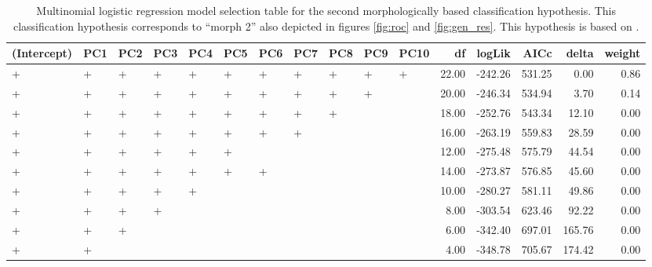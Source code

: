\documentclass[12pt,letterpaper]{article}\usepackage{graphicx, color}
\begin{document}
\begin{table}
  \centering
{\small
\begin{tabular}{lllllllllllrrrrr}
  \hline
(Intercept) & PC1 & PC2 & PC3 & PC4 & PC5 & PC6 & PC7 & PC8 & PC9 & PC10 & df & logLik & AICc & delta & weight \\ 
  \hline
+ & + & + & + & + & + & + & + & + & + & + & 22.00 & -242.26 & 531.25 & 0.00 & 0.86 \\ 
  + & + & + & + & + & + & + & + & + & + &  & 20.00 & -246.34 & 534.94 & 3.70 & 0.14 \\ 
  + & + & + & + & + & + & + & + & + &  &  & 18.00 & -252.76 & 543.34 & 12.10 & 0.00 \\ 
  + & + & + & + & + & + & + & + &  &  &  & 16.00 & -263.19 & 559.83 & 28.59 & 0.00 \\ 
  + & + & + & + & + & + &  &  &  &  &  & 12.00 & -275.48 & 575.79 & 44.54 & 0.00 \\ 
  + & + & + & + & + & + & + &  &  &  &  & 14.00 & -273.87 & 576.85 & 45.60 & 0.00 \\ 
  + & + & + & + & + &  &  &  &  &  &  & 10.00 & -280.27 & 581.11 & 49.86 & 0.00 \\ 
  + & + & + & + &  &  &  &  &  &  &  & 8.00 & -303.54 & 623.46 & 92.22 & 0.00 \\ 
  + & + & + &  &  &  &  &  &  &  &  & 6.00 & -342.40 & 697.01 & 165.76 & 0.00 \\ 
  + & + &  &  &  &  &  &  &  &  &  & 4.00 & -348.78 & 705.67 & 174.42 & 0.00 \\ 
   \hline
\end{tabular}
}


\caption{Multinomial logistic regression model selection table for the second morphologically based classification hypothesis. This classification hypothesis corresponds to ``morph 2'' also depicted in figures \ref{fig:roc} and \ref{fig:gen_res}. This hypothesis is based on \citet{Seeliger1945}.}
  \label{tab:mod_sel_2}
\end{table}
\end{document}
